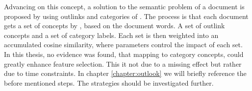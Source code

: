   Advancing on this concept, a solution to the semantic problem of a document is proposed by \cite{WikipediaClustering2010} using outlinks and categories of \wiki{}. The process is that each document gets a set of concepts by \wiki{}, based on the document words. A set of outlink concepts and a set of category labels. Each set is then weighted into an accumulated cosine similarity, where parameters control the impact of each set.\\

  In this thesis, no evidence was found, that mapping to category concepts, could greatly enhance feature selection. This it not due to a missing effect but rather due to time constraints. In chapter \ref{chapter:outlook} we will briefly reference the before mentioned steps. The strategies should be investigated further.

